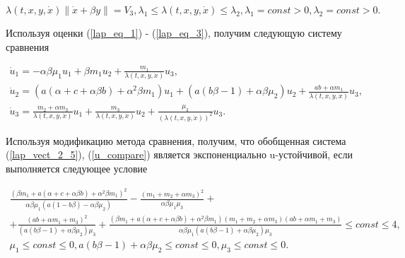 \begin{equation}
\lambda(t, x, y, \dot x) \| \dot x + \beta y \| = V_3, \lambda_1 \le \lambda(t, x, y, \dot x) \le \lambda_2, \lambda_1 = const > 0, \lambda_2 = const > 0.
\end{equation}

Используя оценки (\ref{lap_eq_1}) - (\ref{lap_eq_3}), получим следующую систему сравнения

\begin{equation}
\begin{array}{l}
\dot u_1 = - \alpha \beta \mu_1 u_1 + \beta m_1 u_2 + \frac{m_1}{\lambda(t, x, y, \dot x)} u_3, \\
\dot u_2 = (a (\alpha + c + \alpha \beta b) + \alpha^2 \beta m_1) u_1 + (a (b \beta - 1) + \alpha \beta \mu_2) u_2 + \frac{a b + \alpha m_1}{\lambda(t, x, y, \dot x)} u_3, \\
\dot u_3 = \frac{m_2 + \alpha m_3}{\lambda(t, x, y, \dot x)} u_1 + \frac{m_3}{\lambda(t, x, y, \dot x)} u_2 + \frac{\mu_3}{(\lambda(t, x, y, \dot x))^2} u_3. \label{u_compare}
\end{array}
\end{equation}

Используя модификацию метода сравнения, получим, что обобщенная система (\ref{lap_vect_2_5}), (\ref{u_compare}) является экспоненциально u-устойчивой, если выполняется следующее условие

\begin{equation}
\begin{array}{l}
\frac{(\beta m_1 + a (\alpha + c + \alpha \beta b) + \alpha^2 \beta m_1)^2}{\alpha \beta \mu_1 (a (1 - b \beta) - \alpha \beta \mu_2)} - \frac{(m_1 + m_2 + \alpha m_3)^2}{\alpha \beta \mu_1 \mu_3} + \\ + \frac{(a b + \alpha m_1 + m_3)^2}{(a (b \beta - 1) + \alpha \beta \mu_2) \mu_3} + \frac{(\beta m_1 + a (\alpha + c + \alpha \beta b) + \alpha^2 \beta m_1) (m_1 + m_2 + \alpha m_3) (ab + \alpha m_1 + m_3)}{\alpha \beta \mu_1 (a (b \beta - 1) + \alpha \beta \mu_2) \mu_3} \le const \le 4, \\
 \mu_1 \le const \le 0, a (b \beta - 1) + \alpha \beta \mu_2 \le const \le 0, \mu_3 \le const \le 0. 
\end{array}
\end{equation}
